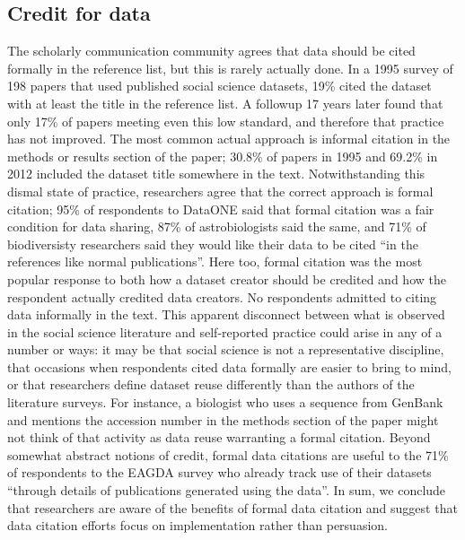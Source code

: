 \documentclass[10pt]{article}
\begin{document}
\subsection*{Credit for data}

The scholarly communication community agrees that data should be cited formally in the reference list\cite{force11_data_citation_synthesis_group_joint_2014}, but this is rarely actually done\cite{sieber_not_1995, mooney_citing_2011, mooney_anatomy_2012}.
In a 1995 survey of 198 papers that used published social science datasets, 19\% cited the dataset with at least the title in the reference list\cite{sieber_not_1995}.
A followup 17 years later found that only 17\% of papers meeting even this low standard, and therefore that practice has not improved\cite{mooney_anatomy_2012}.
The most common actual approach is informal citation in the methods or results section of the paper; 30.8\% of papers in 1995 and 69.2\% in 2012 included the dataset title somewhere in the text.
Notwithstanding this dismal state of practice, researchers agree that the correct approach is formal citation; 95\% of respondents to DataONE said that formal citation was a fair condition for data sharing, 87\% of astrobiologists said the same, and 71\% of biodiversisty researchers said they would like their data to be cited ``in the references like normal publications''\cite{tenopir_data_2011, aydinoglu_data_2014, enke_users_2012}.
Here too, formal citation was the most popular response to both how a dataset creator should be credited and how the respondent actually credited data creators.
No respondents admitted to citing data informally in the text.
This apparent disconnect between what is observed in the social science literature and self-reported practice could arise in any of a number or ways: it may be that social science is not a representative discipline, that occasions when respondents cited data formally are easier to bring to mind, or that researchers define dataset reuse differently than the authors of the literature surveys.
For instance, a biologist who uses a sequence from GenBank and mentions the accession number in the methods section of the paper might not think of that activity as data reuse warranting a formal citation.
Beyond somewhat abstract notions of credit, formal data citations are useful to the 71\% of respondents to the EAGDA survey who already track use of their datasets ``through details of publications generated using the data''\cite{bobrow_establishing_2014}. 
In sum, we conclude that researchers are aware of the benefits of formal data citation and suggest that data citation efforts focus on implementation rather than persuasion. 
\end{document}
